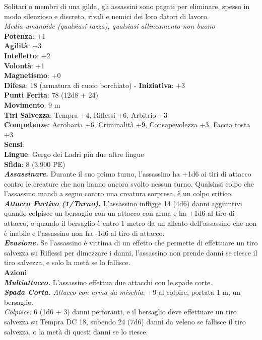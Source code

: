 \begin{multicols}{2}
Solitari o membri di una gilda, gli assassini sono pagati per eliminare, spesso in modo silenzioso e discreto, rivali e nemici dei loro datori di lavoro.\\
\emph{Media umanoide (qualsiasi razza), qualsiasi allineamento non buono}\\
\textbf{Potenza}: +1\\
\textbf{Agilità}: +3\\
\textbf{Intelletto}: +2\\
\textbf{Volontà}: +1\\
\textbf{Magnetismo}: +0\\
\textbf{Difesa}: 18 (armatura di cuoio borchiato) - \textbf{Iniziativa}: +3\\
\textbf{Punti Ferita}: 78 (12d8 + 24)\\
\textbf{Movimento}: 9 m\\
\textbf{Tiri Salvezza}: Tempra +4, Riflessi +6, Arbitrio +3 \\
\textbf{Competenze}: Acrobazia +6, Criminalità +9, Consapevolezza +3, Faccia tosta +3\\
\textbf{Sensi}: \\
\textbf{Lingue}: Gergo dei Ladri più due altre lingue\\
\textbf{Sfida}: 8 (3.900 PE)\smallskip\\

\emph{\textbf{Assassinare.}} Durante il suo primo turno, l'assassino ha +1d6 ai tiri di attacco contro le creature che non hanno ancora svolto nessun turno. Qualsiasi colpo che l'assassino mandi a segno contro una creatura sorpresa, è un colpo critico.\\

\emph{\textbf{Attacco Furtivo (1/Turno).}} L'assassino infligge 14 (4d6) danni aggiuntivi quando colpisce un bersaglio con un attacco con arma e ha +1d6 al tiro di attacco, o quando il bersaglio è entro 1 metro da un alleato dell'assassino che non è inabile e l'assassino non ha -1d6 al tiro di attacco.\\

\emph{\textbf{Evasione.}} Se l'assassino è vittima di un effetto che permette di effettuare un tiro salvezza su Riflessi per dimezzare i danni, l'assassino non prende danni se riesce il tiro salvezza, e solo la metà se lo fallisce.\\

\smallskip\textbf{Azioni}\\

\emph{\textbf{Multiattacco.}} L'assassino effettua due attacchi con le spade corte.\\
\emph{\textbf{Spada Corta.} Attacco con arma da mischia}: +9 al colpire, portata 1 m, un bersaglio.\\
\emph{Colpisce:} 6 (1d6 + 3) danni perforanti, e il bersaglio deve effettuare un tiro salvezza su Tempra DC  18, subendo 24 (7d6) danni da veleno se fallisce il tiro salvezza, o la metà di questi danni se lo riesce.\\


\end{multicols}
